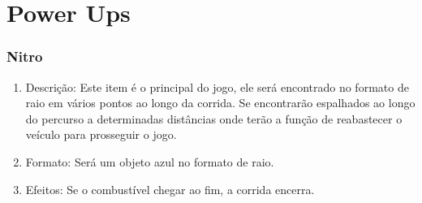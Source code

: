 \part{Power Ups}

\section{Nitro}

\begin{enumerate}

\begin{figure}[!h]
		\centering
	\texttt{[image: figuras/nitro]}
		\caption{Imagem do nitro que abastece o carro}
\end{figure}

	\item Descrição: Este item é o principal do jogo, ele será encontrado no formato de raio em vários pontos ao longo da corrida. Se encontrarão espalhados ao longo do percurso a determinadas distâncias onde terão a função de reabastecer o veículo para prosseguir o jogo.
	\item Formato: Será um objeto azul no formato de raio.
	\item Efeitos: Se o combustível chegar ao fim, a corrida encerra.
	
\end{enumerate}